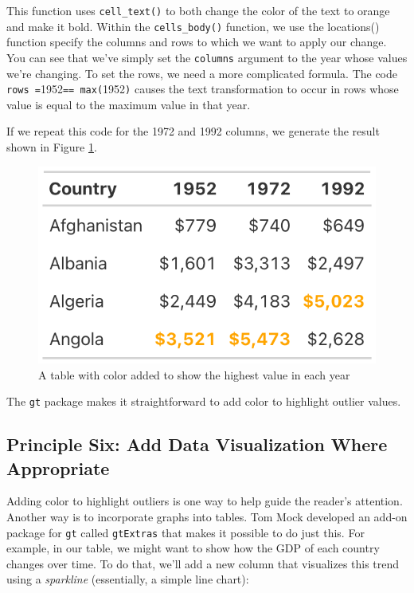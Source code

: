 \documentclass[
]{book}
\begin{document}
This function uses \texttt{cell\_text()} to both change the color of the text to orange and make it bold. Within the \texttt{cells\_body()} function, we use the locations() function specify the columns and rows to which we want to apply our change. You can see that we've simply set the \texttt{columns} argument to the year whose values we're changing. To set the rows, we need a more complicated formula. The code \texttt{rows\ =}1952\texttt{==\ max(}1952\texttt{)} causes the text transformation to occur in rows whose value is equal to the maximum value in that year.

If we repeat this code for the 1972 and 1992 columns, we generate the result shown in Figure \ref{fig:table-highlight-value}.

\begin{figure}
\includegraphics[width=1\linewidth]{nostarch/temp/F05010} \caption{A table with color added to show the highest value in each year}\label{fig:table-highlight-value}
\end{figure}

The \texttt{gt} package makes it straightforward to add color to highlight outlier values.

\hypertarget{principle-six-add-data-visualization-where-appropriate}{%
\subsection*{Principle Six: Add Data Visualization Where Appropriate}\label{principle-six-add-data-visualization-where-appropriate}}

Adding color to highlight outliers is one way to help guide the reader's attention. Another way is to incorporate graphs into tables. Tom Mock developed an add-on package for \texttt{gt} called \texttt{gtExtras} that makes it possible to do just this. For example, in our table, we might want to show how the GDP of each country changes over time. To do that, we'll add a new column that visualizes this trend using a \emph{sparkline} (essentially, a simple line chart):
\end{document}
